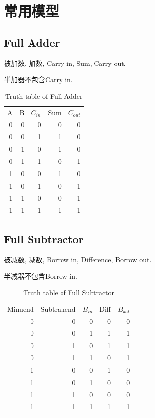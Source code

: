 \documentclass[scheme=chinese,a4paper]{report}
\begin{document}
\section{常用模型}
\subsection{Full Adder}
被加数, 加数, Carry in, Sum, Carry out. \par
半加器不包含Carry in. 
\begin{table}[htb]
    \centering
    \caption{Truth table of Full Adder}
      \begin{tabular}{rrr|rr}
      \multicolumn{1}{l}{A} & \multicolumn{1}{l}{B} & \multicolumn{1}{l}{$ C_{in} $} & \multicolumn{1}{l}{Sum} & \multicolumn{1}{l}{$ C_{out} $} \\
      0     & 0     & 0     & 0     & 0 \\
      0     & 0     & 1     & 1     & 0 \\
      0     & 1     & 0     & 1     & 0 \\
      0     & 1     & 1     & 0     & 1 \\
      1     & 0     & 0     & 1     & 0 \\
      1     & 0     & 1     & 0     & 1 \\
      1     & 1     & 0     & 0     & 1 \\
      1     & 1     & 1     & 1     & 1 \\
      \end{tabular}%
    \label{tab:addlabel}%
  \end{table}%
  
\subsection{Full Subtractor}
被减数, 减数, Borrow in, Difference, Borrow out. \par
半减器不包含Borrow in. 
\begin{table}[htb]
    \centering
    \caption{Truth table of Full Subtractor}
      \begin{tabular}{rrr|rr}
      \multicolumn{1}{l}{Minuend} & \multicolumn{1}{l}{Subtrahend} & \multicolumn{1}{l}{$ B_{in} $} & \multicolumn{1}{l}{Diff} & \multicolumn{1}{l}{$ B_{out} $} \\
      0     & 0     & 0     & 0     & 0 \\
      0     & 0     & 1     & 1     & 1 \\
      0     & 1     & 0     & 1     & 1 \\
      0     & 1     & 1     & 0     & 1 \\
      1     & 0     & 0     & 1     & 0 \\
      1     & 0     & 1     & 0     & 0 \\
      1     & 1     & 0     & 0     & 0 \\
      1     & 1     & 1     & 1     & 1 \\
      \end{tabular}%
    \label{tab:addlabel}%
  \end{table}%
\end{document}
